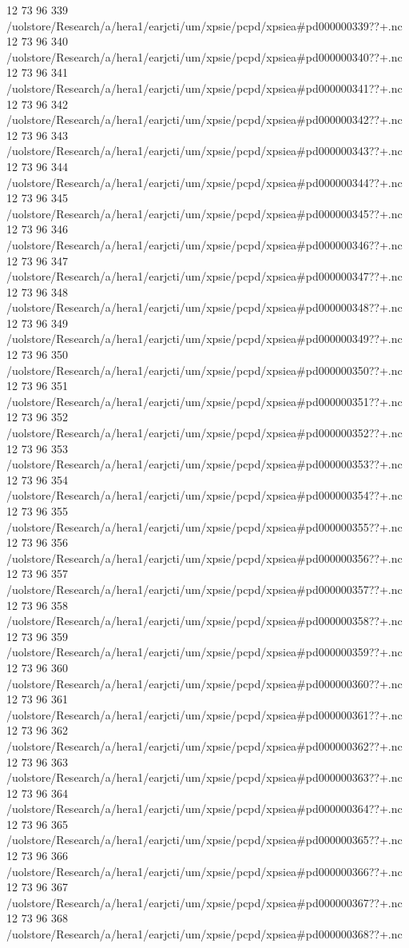 12 73 96
339
/uolstore/Research/a/hera1/earjcti/um/xpsie/pcpd/xpsiea#pd000000339??+.nc
12 73 96
340
/uolstore/Research/a/hera1/earjcti/um/xpsie/pcpd/xpsiea#pd000000340??+.nc
12 73 96
341
/uolstore/Research/a/hera1/earjcti/um/xpsie/pcpd/xpsiea#pd000000341??+.nc
12 73 96
342
/uolstore/Research/a/hera1/earjcti/um/xpsie/pcpd/xpsiea#pd000000342??+.nc
12 73 96
343
/uolstore/Research/a/hera1/earjcti/um/xpsie/pcpd/xpsiea#pd000000343??+.nc
12 73 96
344
/uolstore/Research/a/hera1/earjcti/um/xpsie/pcpd/xpsiea#pd000000344??+.nc
12 73 96
345
/uolstore/Research/a/hera1/earjcti/um/xpsie/pcpd/xpsiea#pd000000345??+.nc
12 73 96
346
/uolstore/Research/a/hera1/earjcti/um/xpsie/pcpd/xpsiea#pd000000346??+.nc
12 73 96
347
/uolstore/Research/a/hera1/earjcti/um/xpsie/pcpd/xpsiea#pd000000347??+.nc
12 73 96
348
/uolstore/Research/a/hera1/earjcti/um/xpsie/pcpd/xpsiea#pd000000348??+.nc
12 73 96
349
/uolstore/Research/a/hera1/earjcti/um/xpsie/pcpd/xpsiea#pd000000349??+.nc
12 73 96
350
/uolstore/Research/a/hera1/earjcti/um/xpsie/pcpd/xpsiea#pd000000350??+.nc
12 73 96
351
/uolstore/Research/a/hera1/earjcti/um/xpsie/pcpd/xpsiea#pd000000351??+.nc
12 73 96
352
/uolstore/Research/a/hera1/earjcti/um/xpsie/pcpd/xpsiea#pd000000352??+.nc
12 73 96
353
/uolstore/Research/a/hera1/earjcti/um/xpsie/pcpd/xpsiea#pd000000353??+.nc
12 73 96
354
/uolstore/Research/a/hera1/earjcti/um/xpsie/pcpd/xpsiea#pd000000354??+.nc
12 73 96
355
/uolstore/Research/a/hera1/earjcti/um/xpsie/pcpd/xpsiea#pd000000355??+.nc
12 73 96
356
/uolstore/Research/a/hera1/earjcti/um/xpsie/pcpd/xpsiea#pd000000356??+.nc
12 73 96
357
/uolstore/Research/a/hera1/earjcti/um/xpsie/pcpd/xpsiea#pd000000357??+.nc
12 73 96
358
/uolstore/Research/a/hera1/earjcti/um/xpsie/pcpd/xpsiea#pd000000358??+.nc
12 73 96
359
/uolstore/Research/a/hera1/earjcti/um/xpsie/pcpd/xpsiea#pd000000359??+.nc
12 73 96
360
/uolstore/Research/a/hera1/earjcti/um/xpsie/pcpd/xpsiea#pd000000360??+.nc
12 73 96
361
/uolstore/Research/a/hera1/earjcti/um/xpsie/pcpd/xpsiea#pd000000361??+.nc
12 73 96
362
/uolstore/Research/a/hera1/earjcti/um/xpsie/pcpd/xpsiea#pd000000362??+.nc
12 73 96
363
/uolstore/Research/a/hera1/earjcti/um/xpsie/pcpd/xpsiea#pd000000363??+.nc
12 73 96
364
/uolstore/Research/a/hera1/earjcti/um/xpsie/pcpd/xpsiea#pd000000364??+.nc
12 73 96
365
/uolstore/Research/a/hera1/earjcti/um/xpsie/pcpd/xpsiea#pd000000365??+.nc
12 73 96
366
/uolstore/Research/a/hera1/earjcti/um/xpsie/pcpd/xpsiea#pd000000366??+.nc
12 73 96
367
/uolstore/Research/a/hera1/earjcti/um/xpsie/pcpd/xpsiea#pd000000367??+.nc
12 73 96
368
/uolstore/Research/a/hera1/earjcti/um/xpsie/pcpd/xpsiea#pd000000368??+.nc
